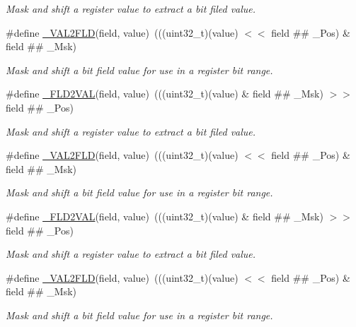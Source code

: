 \begin{DoxyCompactItemize}
\begin{DoxyCompactList}\small\item\em Mask and shift a register value to extract a bit filed value. \end{DoxyCompactList}\item 
\#define \hyperlink{group___c_m_s_i_s__core__bitfield_ga286e3b913dbd236c7f48ea70c8821f4e}{\+\_\+\+V\+A\+L2\+F\+LD}(field,  value)~(((uint32\+\_\+t)(value) $<$$<$ field \#\# \+\_\+\+Pos) \& field \#\# \+\_\+\+Msk)
\begin{DoxyCompactList}\small\item\em Mask and shift a bit field value for use in a register bit range. \end{DoxyCompactList}\item 
\#define \hyperlink{group___c_m_s_i_s__core__bitfield_ga139b6e261c981f014f386927ca4a8444}{\+\_\+\+F\+L\+D2\+V\+AL}(field,  value)~(((uint32\+\_\+t)(value) \& field \#\# \+\_\+\+Msk) $>$$>$ field \#\# \+\_\+\+Pos)
\begin{DoxyCompactList}\small\item\em Mask and shift a register value to extract a bit filed value. \end{DoxyCompactList}\item 
\#define \hyperlink{group___c_m_s_i_s__core__bitfield_ga286e3b913dbd236c7f48ea70c8821f4e}{\+\_\+\+V\+A\+L2\+F\+LD}(field,  value)~(((uint32\+\_\+t)(value) $<$$<$ field \#\# \+\_\+\+Pos) \& field \#\# \+\_\+\+Msk)
\begin{DoxyCompactList}\small\item\em Mask and shift a bit field value for use in a register bit range. \end{DoxyCompactList}\item 
\#define \hyperlink{group___c_m_s_i_s__core__bitfield_ga139b6e261c981f014f386927ca4a8444}{\+\_\+\+F\+L\+D2\+V\+AL}(field,  value)~(((uint32\+\_\+t)(value) \& field \#\# \+\_\+\+Msk) $>$$>$ field \#\# \+\_\+\+Pos)
\begin{DoxyCompactList}\small\item\em Mask and shift a register value to extract a bit filed value. \end{DoxyCompactList}\item 
\#define \hyperlink{group___c_m_s_i_s__core__bitfield_ga286e3b913dbd236c7f48ea70c8821f4e}{\+\_\+\+V\+A\+L2\+F\+LD}(field,  value)~(((uint32\+\_\+t)(value) $<$$<$ field \#\# \+\_\+\+Pos) \& field \#\# \+\_\+\+Msk)
\begin{DoxyCompactList}\small\item\em Mask and shift a bit field value for use in a register bit range. \end{DoxyCompactList}\item 
$$
\end{DoxyCompactItemize}
